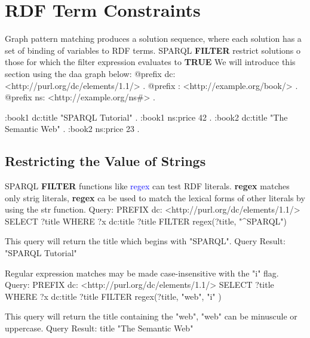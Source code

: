 \newenvironment{fullgreenverb}
{\verbbox}
{\endverbbox\par\colorbox[RGB]{204,255,204}{\parbox{\textwidth}{\theverbbox}}\par}

\newenvironment{fullblueverb}
{\verbbox}
{\endverbbox\par\colorbox[RGB]{204,229,255}{\parbox{\textwidth}{\theverbbox}}\par}
\newenvironment{fullgrayverb}
{\verbbox}
{\endverbbox\par\colorbox[RGB]{211,211,211}{\parbox{\textwidth}{\theverbbox}}\par}

\section{RDF Term Constraints}
Graph pattern matching produces a solution sequence, where each solution has a set of binding of variables to RDF terms. SPARQL \textbf{FILTER} restrict solutions o those for which the filter expression evaluates to \textbf{TRUE}
We will introduce this section using the daa graph below:
\begin{fullgreenverb}
@prefix dc:   <http://purl.org/dc/elements/1.1/> .
@prefix :     <http://example.org/book/> .
@prefix ns:   <http://example.org/ns#> .

:book1  dc:title  "SPARQL Tutorial" .
:book1  ns:price  42 .
:book2  dc:title  "The Semantic Web" .
:book2  ns:price  23 .
\end{fullgreenverb}
\subsection{Restricting the Value of Strings}
SPARQL \textbf{FILTER} functions like \textcolor{blue}{regex} can test RDF literals. \textbf{regex} matches only strig literals, \textbf{regex} ca be used to match the lexical forms of other literals by using the str function.
Query:
\begin{fullblueverb}
PREFIX  dc:  <http://purl.org/dc/elements/1.1/>
SELECT  ?title
WHERE   { ?x dc:title ?title
          FILTER regex(?title, "^SPARQL") 
        }
\end{fullblueverb}
This query will return the title which begins with "SPARQL".
Query Result:
\begin{fullgrayverb}
"SPARQL Tutorial"
\end{fullgrayverb}
Regular expression matches may be made case-insensitive with the "i" flag.
Query:
\begin{fullblueverb}
PREFIX  dc:  <http://purl.org/dc/elements/1.1/>
SELECT  ?title
WHERE   { ?x dc:title ?title
          FILTER regex(?title, "web", "i" ) 
        }
\end{fullblueverb}
This query will return the title containing the "web", "web" can be minuscule or uppercase.
Query Result:
\begin{fullgrayverb}
title
"The Semantic Web"
\end{fullgrayverb}
